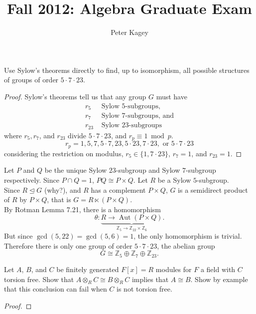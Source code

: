 \documentclass{article}
\newenvironment{problem}[2][Problem]{\begin{trivlist}
\item[\hskip \labelsep {\bfseries #1}\hskip \labelsep {\bfseries #2.}]}{\end{trivlist}}
\newcommand{\Z}{\mathbb Z}
\newcommand{\normalsubgroup}{\trianglelefteq}
\begin{document}
\title{Fall 2012: Algebra Graduate Exam}
\author{Peter Kagey}

\maketitle

\begin{problem}{1}
  Use Sylow's theorems directly to find, up to isomorphism, all possible structures of groups of order $5 \cdot 7 \cdot 23$.
\end{problem}

\begin{proof}
  Sylow's theorems tell us that any group $G$ must have \begin{align*}
    r_5 &\text{ Sylow } 5\text{-subgroups,} \\
    r_7 &\text{ Sylow } 7\text{-subgroups, and} \\
    r_{23} &\text{ Sylow } 23\text{-subgroups}
  \end{align*} where $r_5, r_7$, and $r_{23}$ divide $5 \cdot 7 \cdot 23$, and $r_p \equiv 1 \bmod p$. \[
    r_p = 1, 5, 7, 5 \cdot 7, 23, 5 \cdot 23, 7 \cdot 23, \text{ or } 5 \cdot 7 \cdot 23
  \] considering the restriction on modulus,
    $r_5 \in \{1, 7 \cdot 23\}$,
    $r_7 = 1$, and
    $r_{23} = 1$.
\end{proof} Let $P$ and $Q$ be the unique Sylow $23$-subgroup and Sylow
$7$-subgroup respectively.
Since $P \cap Q = 1$, $PQ \cong P \times Q$. Let $R$ be a Sylow $5$-subgroup.
\\
Since $R \normalsubgroup G$ (why?), and $R$ has a complement $P \times Q$, $G$ is a
semidirect product of $R$ by $P \times Q$, that is $G = R \ltimes (P \times Q)$.
\\
By Rotman Lemma 7.21, there is a homomorphism \[
  \theta\colon \underbrace{R \rightarrow \operatorname{Aut}(P \times Q)}_{\Z_5 \rightarrow \Z_{22} \times \Z_6}.
\]
But since $\gcd(5, 22) = \gcd(5, 6) = 1$, the only homomorphism is trivial.
Therefore there is only one group of order $5 \cdot 7 \cdot 23$, the abelian
group \[
  G \cong \Z_5 \oplus \Z_7 \oplus \Z_{23}.
\]
\pagebreak

\begin{problem}{2}
  Let $A$, $B$, and $C$ be finitely generated $F[x] = R$ modules for $F$ a field with $C$ torsion free. Show that $A \otimes_R C \cong B \otimes_R C$ implies that $A \cong B$.
  Show by example that this conclusion can fail when $C$ is not torsion free.
\end{problem}

\begin{proof}
\end{proof}
\end{document}
